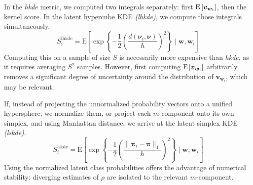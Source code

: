 In the \emph{hkde} metric, we computed two integrals separately: first 
    $\text{E}\left[\bm{v}_{\bm{w}_i}\right]$, then the kernel score.  In the latent hypercube 
    KDE \emph{(lhkde)}, we compute those integrals simultaneously.
    \begin{equation}
        \label{score:cat_lhkde}
        S_i^{\text{lhkde}} = \text{E}\left[
        \exp\left\lbrace
        -\frac{1}{2}\left(
        \frac{d(\bm{\nu}_i, \bm{\nu})}{h}
        \right)^2
        \right\rbrace 
        \mid \bm{w}, \bm{w}_i
        \right]
    \end{equation}
    Computing this on a sample of size $S$ is necessarily more expensive than 
    \emph{hkde}, as it requires averaging $S^2$ samples.  However, first 
    computing $\text{E}\left[\bm{v}_{\bm{w}_i}\right]$ arbitrarily removes a significant 
    degree of uncertainty around the distribution of $\bm{v}_{\bm{w}_i}$, which 
    may be relevant.

If, instead of projecting the unnormalized probability vectors onto a unified 
    hypersphere, we normalize them, or project each $m$-component onto its 
    own simplex, and using Manhattan distance, we arrive at the latent simplex 
    KDE \emph{(lskde)}.
    \begin{equation}
        \label{score:cat_lskde}
        S_i^{\text{lskde}} = \text{E}\left[\exp\left\lbrace
        -\frac{1}{2}\left(
        \frac{\lVert \bm{\pi}_i - \bm{\pi}\rVert_1}{h}
        \right)^2
        \right\rbrace
        \mid \bm{w},\bm{w}_i
        \right]
    \end{equation}
    Using the normalized latent class probabilities offers the advantage of
    numerical stability: diverging estimates of $\rho$ are isolated to the
    relevant $m$-component.

